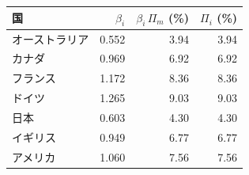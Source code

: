 \begin{tabular}{lrrr}
\toprule
国 & $\beta_i$ & $\beta_i\,\Pi_m$ (\%) & $\Pi_i$ (\%) \\
\midrule
オーストラリア & 0.552 & 3.94 & 3.94 \\
カナダ & 0.969 & 6.92 & 6.92 \\
フランス & 1.172 & 8.36 & 8.36 \\
ドイツ & 1.265 & 9.03 & 9.03 \\
日本 & 0.603 & 4.30 & 4.30 \\
イギリス & 0.949 & 6.77 & 6.77 \\
アメリカ & 1.060 & 7.56 & 7.56 \\
\bottomrule
\end{tabular}
